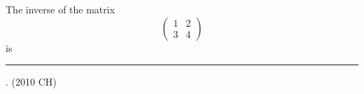 \item 
 The inverse of the matrix 
 \[
 \begin{pmatrix}
     1 & 2\\
     3 & 4
 \end{pmatrix}  
 \] 
is \rule{1cm}{0.01pt}.
\hfill{(2010 CH)}
 

